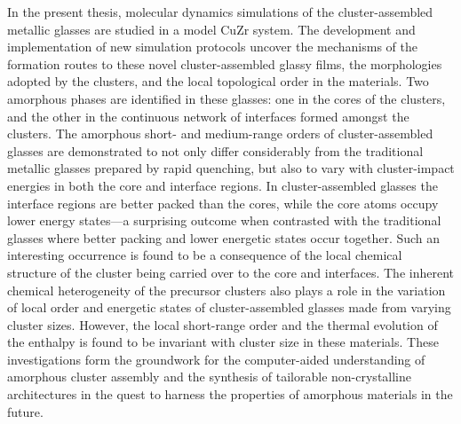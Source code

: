 In the present thesis, molecular dynamics simulations of the cluster-assembled metallic glasses are studied in a model CuZr system. The development and implementation of new simulation protocols uncover the mechanisms of the formation routes to these novel cluster-assembled glassy films, the morphologies adopted by the clusters, and the local topological order in the materials. Two amorphous phases are identified in these glasses: one in the cores of the clusters, and the other in the continuous network of interfaces formed amongst the clusters. The amorphous short- and medium-range orders of cluster-assembled glasses are demonstrated to not only differ considerably from the traditional metallic glasses prepared by rapid quenching, but also to vary with cluster-impact energies in both the core and interface regions. In cluster-assembled glasses the interface regions are better packed than the cores, while the core atoms occupy lower energy states---a surprising outcome when contrasted with the traditional glasses where better packing and lower energetic states occur together.
%
Such an interesting occurrence is found to be a consequence of the local chemical structure of the cluster being carried over to the core and interfaces. The inherent chemical heterogeneity of the precursor clusters also plays a role in the variation of local order and energetic states of cluster-assembled glasses made from varying cluster sizes. However, the local short-range order and the thermal evolution of the enthalpy is found to be invariant with cluster size in these materials. These investigations form the groundwork for the computer-aided understanding of amorphous cluster assembly and the synthesis of tailorable non-crystalline architectures in the quest to harness the properties of amorphous materials in the future. %

